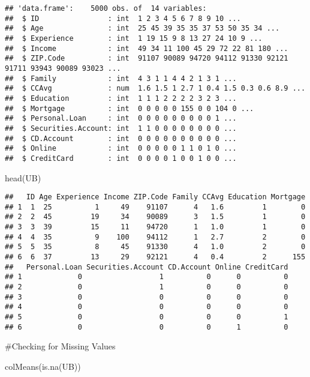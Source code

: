 \documentclass[
]{article}
\newenvironment{Shaded}{\begin{snugshade}}{\end{snugshade}}
\newcommand{\FunctionTok}[1]{\textcolor[rgb]{0.00,0.00,0.00}{#1}}
\newcommand{\NormalTok}[1]{#1}
\begin{document}
\begin{verbatim}
## 'data.frame':    5000 obs. of  14 variables:
##  $ ID                : int  1 2 3 4 5 6 7 8 9 10 ...
##  $ Age               : int  25 45 39 35 35 37 53 50 35 34 ...
##  $ Experience        : int  1 19 15 9 8 13 27 24 10 9 ...
##  $ Income            : int  49 34 11 100 45 29 72 22 81 180 ...
##  $ ZIP.Code          : int  91107 90089 94720 94112 91330 92121 91711 93943 90089 93023 ...
##  $ Family            : int  4 3 1 1 4 4 2 1 3 1 ...
##  $ CCAvg             : num  1.6 1.5 1 2.7 1 0.4 1.5 0.3 0.6 8.9 ...
##  $ Education         : int  1 1 1 2 2 2 2 3 2 3 ...
##  $ Mortgage          : int  0 0 0 0 0 155 0 0 104 0 ...
##  $ Personal.Loan     : int  0 0 0 0 0 0 0 0 0 1 ...
##  $ Securities.Account: int  1 1 0 0 0 0 0 0 0 0 ...
##  $ CD.Account        : int  0 0 0 0 0 0 0 0 0 0 ...
##  $ Online            : int  0 0 0 0 0 1 1 0 1 0 ...
##  $ CreditCard        : int  0 0 0 0 1 0 0 1 0 0 ...
\end{verbatim}

\begin{Shaded}
\begin{Highlighting}[]
\FunctionTok{head}\NormalTok{(UB)}
\end{Highlighting}
\end{Shaded}

\begin{verbatim}
##   ID Age Experience Income ZIP.Code Family CCAvg Education Mortgage
## 1  1  25          1     49    91107      4   1.6         1        0
## 2  2  45         19     34    90089      3   1.5         1        0
## 3  3  39         15     11    94720      1   1.0         1        0
## 4  4  35          9    100    94112      1   2.7         2        0
## 5  5  35          8     45    91330      4   1.0         2        0
## 6  6  37         13     29    92121      4   0.4         2      155
##   Personal.Loan Securities.Account CD.Account Online CreditCard
## 1             0                  1          0      0          0
## 2             0                  1          0      0          0
## 3             0                  0          0      0          0
## 4             0                  0          0      0          0
## 5             0                  0          0      0          1
## 6             0                  0          0      1          0
\end{verbatim}

\#Checking for Missing Values

\begin{Shaded}
\begin{Highlighting}[]
\FunctionTok{colMeans}\NormalTok{(}\FunctionTok{is.na}\NormalTok{(UB))  }
\end{Highlighting}
\end{Shaded}
\end{document}

